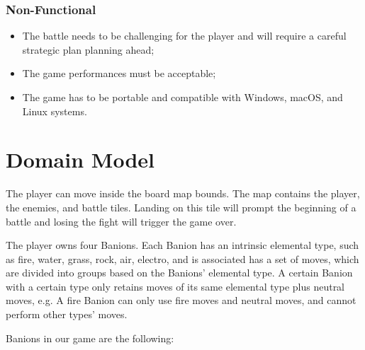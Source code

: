 \documentclass[12pt, a4paper]{report}
\theoremstyle{definition}
\begin{document}
\subsubsection{Non-Functional}

\begin{itemize}
    \item The battle needs to be challenging for the player and will require a careful strategic plan planning ahead; \label{challengingbattle}
    \item The game performances must be acceptable;
    \item The game has to be portable and compatible with Windows, macOS, and Linux systems.
\end{itemize}

\section{Domain Model}

    The player can move inside the board map bounds. The map contains the player, the enemies, and battle tiles.
    Landing on this tile will prompt the beginning of a battle and losing the fight will trigger the game over.

    The player owns four Banions. Each Banion has an intrinsic elemental type, such as fire, water, grass, rock, air, electro,
    and is associated has a set of moves, which are divided into groups based on the Banions' elemental type. A certain Banion with a certain
    type only retains moves of its same elemental type plus neutral moves, e.g. A fire Banion can only use fire moves and neutral moves,
    and cannot perform other types' moves.

    Banions in our game are the following:
\end{document}
